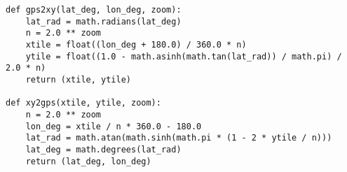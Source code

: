 \begin{verbatim}
def gps2xy(lat_deg, lon_deg, zoom):
    lat_rad = math.radians(lat_deg)
    n = 2.0 ** zoom
    xtile = float((lon_deg + 180.0) / 360.0 * n)
    ytile = float((1.0 - math.asinh(math.tan(lat_rad)) / math.pi) / 2.0 * n)
    return (xtile, ytile)

def xy2gps(xtile, ytile, zoom):
    n = 2.0 ** zoom
    lon_deg = xtile / n * 360.0 - 180.0
    lat_rad = math.atan(math.sinh(math.pi * (1 - 2 * ytile / n)))
    lat_deg = math.degrees(lat_rad)
    return (lat_deg, lon_deg)
\end{verbatim}


































